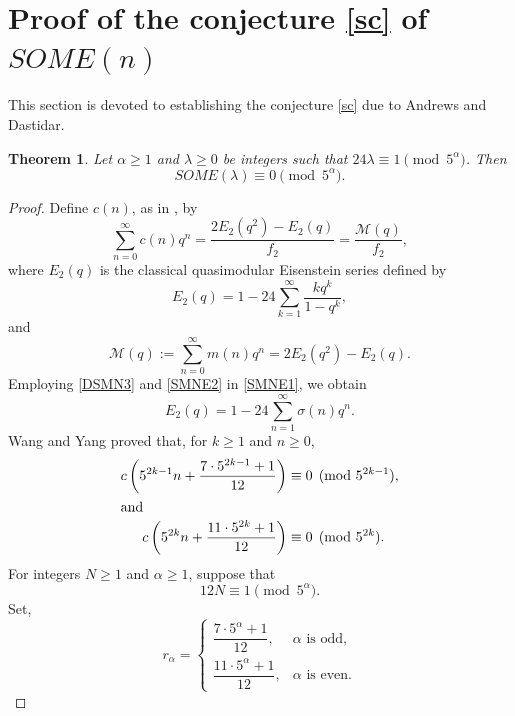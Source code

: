 \documentclass[12pt]{article}
\numberwithin{equation}{section}
\newtheorem{theorem}{Theorem}[section]
\theoremstyle{definition}
\theoremstyle{remark}
\numberwithin{equation}{section}
\begin{document}
\section{Proof of the conjecture \eqref{sc} of $SOME(n)$}
This section is devoted to establishing the conjecture \eqref{sc} due to Andrews and Dastidar.

\begin{theorem}
Let $\alpha\geq1$ and $\lambda\geq0$ be integers such that
$24\lambda\equiv1\pmod{5^\alpha}$.
Then
$$SOME(\lambda)\equiv0\pmod{5^\alpha}.$$
\end{theorem}

\begin{proof}Define $c(n)$, as in \cite[(1.28)]{WY}, by
\begin{equation}\label{SOMEC10}
\sum_{n=0}^{\infty}c(n)q^n
=
\dfrac{2E_2(q^2)-E_2(q)}{f_2}
=
\dfrac{\mathcal{M}(q)}{f_2},
\end{equation}
where $E_2(q)$ \cite[(4.1.7)]{bc} is the classical quasimodular Eisenstein series defined by
\begin{equation}\label{SMNE1}
    E_2(q)=1-24\sum_{k=1}^{\infty}\dfrac{kq^k}{1-q^k},
\end{equation}
and
\begin{equation}\label{SOMEC4}
\mathcal{M}(q):=\sum_{n=0}^{\infty}m(n)q^n=2E_2(q^2)-E_2(q).
\end{equation}
Employing \eqref{DSMN3} and  \eqref{SMNE2}  in \eqref{SMNE1}, we obtain
\begin{equation}\label{SOMEC5}
E_2(q)=1-24\sum_{n=1}^{\infty}\sigma(n)q^n.
\end{equation}
Wang and Yang \cite[Theorem~1.1]{WY} proved that, for $k\geq1$ and $n\geq0$,
\begin{align}
c\left(5^{2k-1}n+\dfrac{7\cdot5^{2k-1}+1}{12}\right)
&\label{WY1}\equiv0\pmod{5^{2k-1}}, \\\intertext{and}
c\left(5^{2k}n+\dfrac{11\cdot5^{2k}+1}{12}\right)
&\label{WY2}\equiv0\pmod{5^{2k}}. 
\end{align}
For integers $N\ge 1$ and $\alpha\geq1$, suppose that
\begin{equation}\label{WY3}
12N\equiv1\pmod{5^\alpha}.
\end{equation}
Set,
\begin{equation}\label{WY5}
r_\alpha=
\begin{cases}
\dfrac{7\cdot5^\alpha+1}{12}, & \alpha \text{ is odd},\\[8pt]
\dfrac{11\cdot5^\alpha+1}{12}, & \alpha \text{ is even}.
\end{cases}

\end{equation}
\end{proof}
\end{document}
